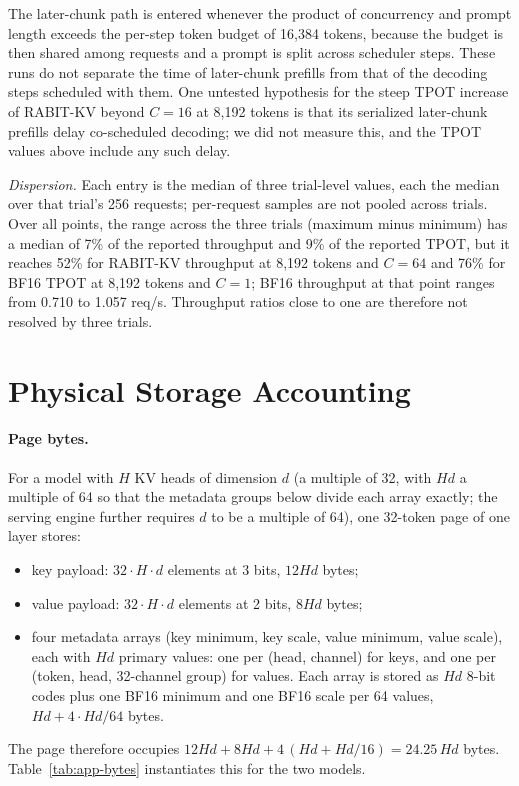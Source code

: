 \documentclass{article}
\begin{document}
The later-chunk path is entered whenever the product of concurrency and prompt length exceeds the
per-step token budget of 16,384 tokens, because the budget is then shared among requests and a prompt
is split across scheduler steps. These runs do not separate the time of later-chunk prefills from that
of the decoding steps scheduled with them. One untested hypothesis for the steep TPOT increase of
RABIT-KV beyond $C{=}16$ at 8,192 tokens is that its serialized later-chunk prefills delay co-scheduled
decoding; we did not measure this, and the TPOT values above include any such delay.

\emph{Dispersion.} Each entry is the median of three trial-level values, each the median over that
trial's 256 requests; per-request samples are not pooled across trials. Over all points, the range
across the three trials (maximum minus minimum) has a median of 7\% of the reported throughput and 9\%
of the reported TPOT, but it reaches 52\% for RABIT-KV throughput at 8,192 tokens and $C{=}64$ and 76\%
for BF16 TPOT at 8,192 tokens and $C{=}1$; BF16 throughput at that point ranges from 0.710 to 1.057
req/s. Throughput ratios close to one are therefore not resolved by three trials.

\section{Physical Storage Accounting}
\label{app:storage}

\paragraph{Page bytes.}
For a model with $H$ KV heads of dimension $d$ (a multiple of 32, with $Hd$ a multiple of 64 so that
the metadata groups below divide each array exactly; the serving engine further requires $d$ to be a
multiple of 64), one 32-token page of one layer stores:
\begin{itemize}
\item key payload: $32 \cdot H \cdot d$ elements at 3 bits, $12Hd$ bytes;
\item value payload: $32 \cdot H \cdot d$ elements at 2 bits, $8Hd$ bytes;
\item four metadata arrays (key minimum, key scale, value minimum, value scale), each with $Hd$
  primary values: one per (head, channel) for keys, and one per (token, head, 32-channel group) for
  values. Each array is stored as $Hd$ 8-bit codes plus one BF16 minimum and one BF16 scale per 64
  values, $Hd + 4 \cdot Hd/64$ bytes.
\end{itemize}
The page therefore occupies $12Hd + 8Hd + 4\,(Hd + Hd/16) = 24.25\,Hd$ bytes.
Table~\ref{tab:app-bytes} instantiates this for the two models.
\end{document}
